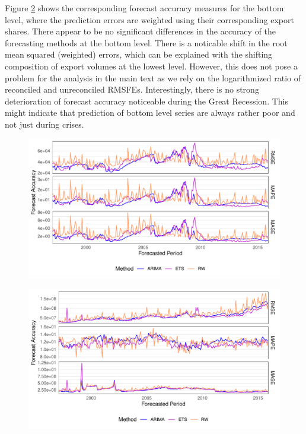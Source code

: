 Figure \ref{fig:eval_methods_bottom} shows the corresponding forecast accuracy measures for the bottom level, where the prediction errors are weighted using their corresponding export shares. There appear to be no significant differences in the accuracy of the forecasting methods at the bottom level. There is a noticable shift in the root mean squared (weighted) errors, which can be explained with the shifting composition of export volumes at the lowest level. However, this does not pose a problem for the analysis in the main text as we rely on the logarithmized ratio of reconciled and unreconciled RMSFEs. Interestingly, there is no strong deterioration of forecast accuracy noticeable during the Great Recession. This might indicate that prediction of bottom level series are always rather poor and not just during crises.

\begin{figure}[H]
	\includegraphics[width=\textwidth]{fig/fig_eval_methods_top}
	\label{fig:eval_methods_top}
\end{figure}



\begin{figure}[H]
	\includegraphics[width=\textwidth]{fig/fig_eval_methods_bottom}
	\label{fig:eval_methods_bottom}
\end{figure}





